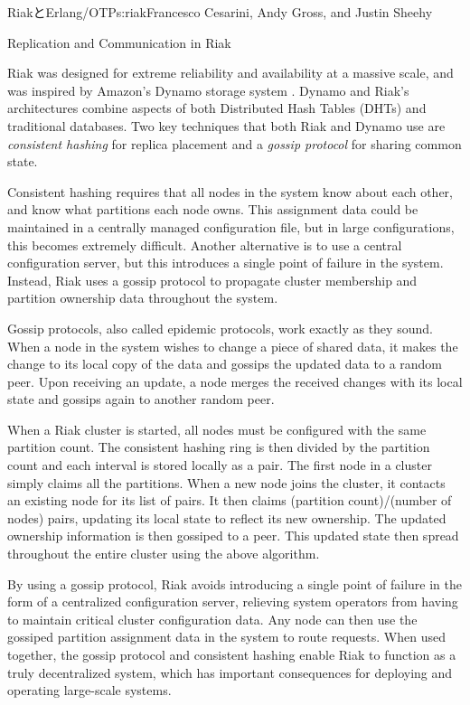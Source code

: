 \begin{aosachapter}{RiakとErlang/OTP}{s:riak}{Francesco Cesarini, Andy Gross, and Justin Sheehy}
\begin{aosasect1}{Replication and Communication in Riak}

Riak was designed for extreme reliability and availability at a
massive scale, and was inspired by Amazon's Dynamo storage system
\cite{bib:amazon:dynamo}.  Dynamo and Riak's architectures combine
aspects of both Distributed Hash Tables (DHTs) and traditional
databases.  Two key techniques that both Riak and Dynamo use are
\emph{consistent hashing} for replica placement and a \emph{gossip
protocol} for sharing common state.

Consistent hashing requires that all nodes in the system know about
each other, and know what partitions each node owns.  This assignment
data could be maintained in a centrally managed configuration file,
but in large configurations, this becomes extremely difficult. Another
alternative is to use a central configuration server, but this
introduces a single point of failure in the system. Instead, Riak uses
a gossip protocol to propagate cluster membership and partition
ownership data throughout the system.

Gossip protocols, also called epidemic protocols, work exactly as they
sound.  When a node in the system wishes to change a piece of shared
data, it makes the change to its local copy of the data and gossips
the updated data to a random peer.  Upon receiving an update, a node
merges the received changes with its local state and gossips again to
another random peer.

When a Riak cluster is started, all nodes must be configured with the
same partition count. The consistent hashing ring is then divided by
the partition count and each interval is stored locally as a
 pair. The first node in a cluster simply
claims all the partitions.  When a new node joins the cluster, it
contacts an existing node for its list of 
pairs.  It then claims (partition count)/(number of nodes) pairs,
updating its local state to reflect its new ownership. The updated
ownership information is then gossiped to a peer. This updated state
then spread throughout the entire cluster using the above algorithm.

By using a gossip protocol, Riak avoids introducing a single point of
failure in the form of a centralized configuration server, relieving
system operators from having to maintain critical cluster
configuration data.  Any node can then use the gossiped partition
assignment data in the system to route requests.  When used together,
the gossip protocol and consistent hashing enable Riak to function as
a truly decentralized system, which has important consequences for
deploying and operating large-scale systems.


\end{aosasect1}
\end{aosachapter}
